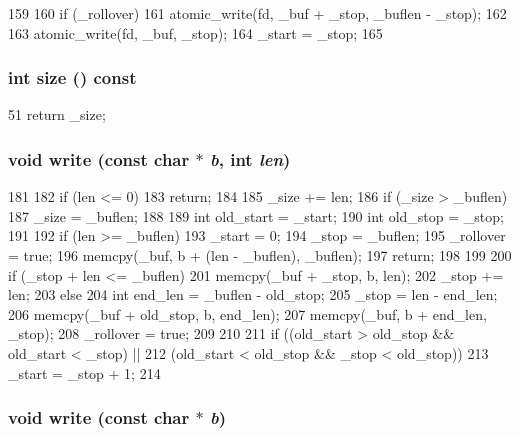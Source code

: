 \begin{DoxyCode}
159 {
160     if (_rollover)
161         atomic_write(fd, _buf + _stop, _buflen - _stop);
162 
163     atomic_write(fd, _buf, _stop);
164     _start = _stop;
165 }
\end{DoxyCode}
\hypertarget{classCircleBuf_ab8e4e3e2a7bf18888b71bdf9dda0770b}{
\subsubsection[{size}]{\setlength{\rightskip}{0pt plus 5cm}int size () const}}
\label{classCircleBuf_ab8e4e3e2a7bf18888b71bdf9dda0770b}



\begin{DoxyCode}
51 { return _size; }
\end{DoxyCode}
\hypertarget{classCircleBuf_a4dc60fcb37e3faf4658e301baf4a2be8}{
\subsubsection[{write}]{\setlength{\rightskip}{0pt plus 5cm}void write (const char $\ast$ {\em b}, \/  int {\em len})}}
\label{classCircleBuf_a4dc60fcb37e3faf4658e301baf4a2be8}



\begin{DoxyCode}
181 {
182     if (len <= 0)
183         return;
184 
185     _size += len;
186     if (_size > _buflen)
187         _size = _buflen;
188 
189     int old_start = _start;
190     int old_stop = _stop;
191 
192     if (len >= _buflen) {
193         _start = 0;
194         _stop = _buflen;
195         _rollover = true;
196         memcpy(_buf, b + (len - _buflen), _buflen);
197         return;
198     }
199 
200     if (_stop + len <= _buflen) {
201         memcpy(_buf + _stop, b, len);
202         _stop += len;
203     } else {
204         int end_len = _buflen - old_stop;
205         _stop = len - end_len;
206         memcpy(_buf + old_stop, b, end_len);
207         memcpy(_buf, b + end_len, _stop);
208         _rollover = true;
209     }
210 
211     if ((old_start > old_stop && old_start < _stop) ||
212         (old_start < old_stop && _stop < old_stop))
213         _start = _stop + 1;
214 }
\end{DoxyCode}
\hypertarget{classCircleBuf_adeb1ea40a2a10d78a2143225d4c8045b}{
\subsubsection[{write}]{\setlength{\rightskip}{0pt plus 5cm}void write (const char $\ast$ {\em b})}}
\label{classCircleBuf_adeb1ea40a2a10d78a2143225d4c8045b}



